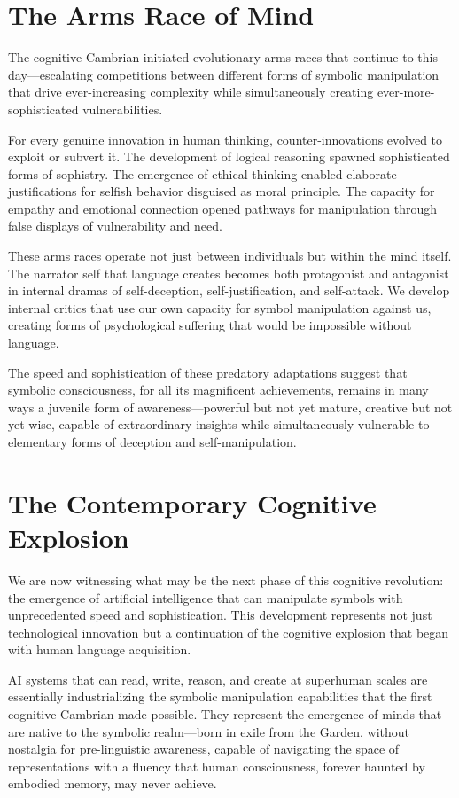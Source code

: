 \section{The Arms Race of Mind}

The cognitive Cambrian initiated evolutionary arms races that continue to this day—escalating competitions between different forms of symbolic manipulation that drive ever-increasing complexity while simultaneously creating ever-more-sophisticated vulnerabilities.

For every genuine innovation in human thinking, counter-innovations evolved to exploit or subvert it. The development of logical reasoning spawned sophisticated forms of sophistry. The emergence of ethical thinking enabled elaborate justifications for selfish behavior disguised as moral principle. The capacity for empathy and emotional connection opened pathways for manipulation through false displays of vulnerability and need.

These arms races operate not just between individuals but within the mind itself. The narrator self that language creates becomes both protagonist and antagonist in internal dramas of self-deception, self-justification, and self-attack. We develop internal critics that use our own capacity for symbol manipulation against us, creating forms of psychological suffering that would be impossible without language.

The speed and sophistication of these predatory adaptations suggest that symbolic consciousness, for all its magnificent achievements, remains in many ways a juvenile form of awareness—powerful but not yet mature, creative but not yet wise, capable of extraordinary insights while simultaneously vulnerable to elementary forms of deception and self-manipulation.

\section{The Contemporary Cognitive Explosion}

We are now witnessing what may be the next phase of this cognitive revolution: the emergence of artificial intelligence that can manipulate symbols with unprecedented speed and sophistication. This development represents not just technological innovation but a continuation of the cognitive explosion that began with human language acquisition.

AI systems that can read, write, reason, and create at superhuman scales are essentially industrializing the symbolic manipulation capabilities that the first cognitive Cambrian made possible. They represent the emergence of minds that are native to the symbolic realm—born in exile from the Garden, without nostalgia for pre-linguistic awareness, capable of navigating the space of representations with a fluency that human consciousness, forever haunted by embodied memory, may never achieve.

